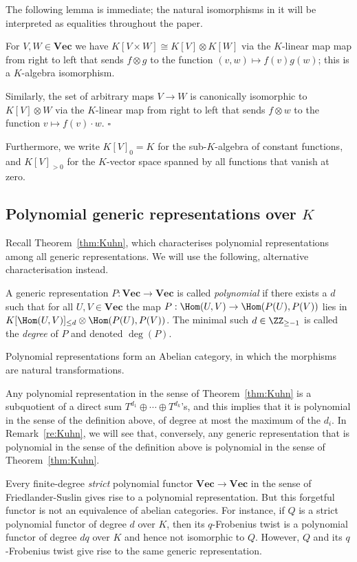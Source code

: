 \documentclass{amsart}
\renewcommand{\Vec}{\mathbf{Vec}}
\begin{document}
The following lemma is immediate; the natural isomorphisms in it will
be interpreted as equalities throughout the paper.

\begin{lm}
For $V,W \in \Vec$ we have $K[V \times W] \cong K[V] \otimes K[W]$ via
the $K$-linear map map from right to left that sends $f \otimes g$ to
the function $(v,w) \mapsto f(v)g(w)$; this is a $K$-algebra isomorphism.

Similarly, the set of arbitrary maps $V \to W$ is canonically isomorphic to $K[V]
\otimes W$ via the $K$-linear map from right to left that sends $f
\otimes w$ to the function $v \mapsto f(v) \cdot w$.
\hfill $\square$
\end{lm}

Furthermore, we write $K[V]_0=K$ for the sub-$K$-algebra of constant
functions, and $K[V]_{>0}$ for the $K$-vector space spanned by all
functions that vanish at zero.

\subsection{Polynomial generic representations over $K$}

Recall Theorem~\ref{thm:Kuhn}, which characterises polynomial representations
among all generic representations. We will use the
following, alternative characterisation instead.

\begin{de} \label{de:PolRep}
A generic representation $P:\Vec \to \Vec$ is called {\em polynomial}
if there exists a $d$ such that for all $U,V \in \Vec$ the map
$P:\Hom(U,V) \to \Hom(P(U),P(V))$ lies in $K[\Hom(U,V)]_{\leq d} \otimes
\Hom(P(U),P(V))$. The minimal such $d \in \ZZ_{\geq -1}$ is called the
{\em degree} of $P$ and denoted $\deg(P)$.
\end{de}

Polynomial representations form an Abelian category, in which the
morphisms are natural transformations.

Any polynomial representation in the sense of Theorem~\ref{thm:Kuhn} is a
subquotient of a direct sum $T^{d_1} \oplus \cdots \oplus T^{d_k}$'s, and
this implies that it is polynomial in the sense of the definition above,
of degree at most the maximum of the $d_i$. In Remark~\ref{re:Kuhn},
we will see that, conversely, any generic representation that is
polynomial in the sense of the definition above is polynomial in the
sense of Theorem~\ref{thm:Kuhn}.

Every finite-degree {\em strict} polynomial functor $\Vec \to \Vec$
in the sense of Fried\-lan\-der-Suslin \cite{Friedlander97} gives rise
to a polynomial representation. But this forgetful functor
is not an equivalence of abelian categories. For instance, if $Q$ is a
strict polynomial functor of degree $d$ over $K$, then its $q$-Frobenius
twist is a polynomial functor of degree $dq$ over $K$ and hence not
isomorphic to $Q$. However, $Q$ and its $q$-Frobenius twist give rise to
the same generic representation.
\end{document}
